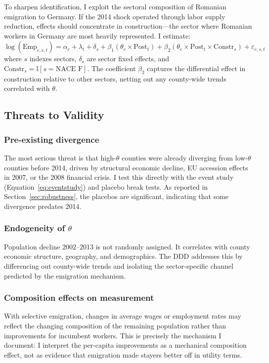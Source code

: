 \documentclass[12pt]{article}
\newcommand{\ind}{\mathbb{I}}
\begin{document}
To sharpen identification, I exploit the sectoral composition of Romanian emigration to Germany. If the 2014 shock operated through labor supply reduction, effects should concentrate in construction---the sector where Romanian workers in Germany are most heavily represented. I estimate:
\begin{equation}
\log(\text{Emp}_{c,s,t}) = \alpha_c + \lambda_t + \delta_s + \beta_1 (\theta_c \times \text{Post}_t) + \beta_2 (\theta_c \times \text{Post}_t \times \text{Constr}_s) + \varepsilon_{c,s,t}
\label{eq:ddd}
\end{equation}
where $s$ indexes sectors, $\delta_s$ are sector fixed effects, and $\text{Constr}_s = \ind[s = \text{NACE F}]$. The coefficient $\beta_2$ captures the differential effect in construction relative to other sectors, netting out any county-wide trends correlated with $\theta$.

\subsection{Threats to Validity}
\label{sec:threats}

\subsubsection*{Pre-existing divergence} The most serious threat is that high-$\theta$ counties were already diverging from low-$\theta$ counties before 2014, driven by structural economic decline, EU accession effects in 2007, or the 2008 financial crisis. I test this directly with the event study (Equation~\ref{eq:eventstudy}) and placebo break tests. As reported in Section~\ref{sec:robustness}, the placebos are significant, indicating that some divergence predates 2014.

\subsubsection*{Endogeneity of $\theta$} Population decline 2002--2013 is not randomly assigned. It correlates with county economic structure, geography, and demographics. The DDD addresses this by differencing out county-wide trends and isolating the sector-specific channel predicted by the emigration mechanism.

\subsubsection*{Composition effects on measurement} With selective emigration, changes in average wages or employment rates may reflect the changing composition of the remaining population rather than improvements for incumbent workers. This is precisely the mechanism I document: I interpret the per-capita improvements as a mechanical composition effect, not as evidence that emigration made stayers better off in utility terms.
\end{document}
